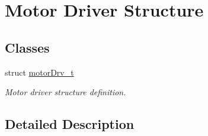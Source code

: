 \hypertarget{group___motor___driver___structure}{}\section{Motor Driver Structure}
\label{group___motor___driver___structure}
\subsection*{Classes}
\begin{DoxyCompactItemize}
\item 
struct \mbox{\hyperlink{structmotor_drv__t}{motor\+Drv\+\_\+t}}
\begin{DoxyCompactList}\small\item\em Motor driver structure definition. \end{DoxyCompactList}\end{DoxyCompactItemize}


\subsection{Detailed Description}
